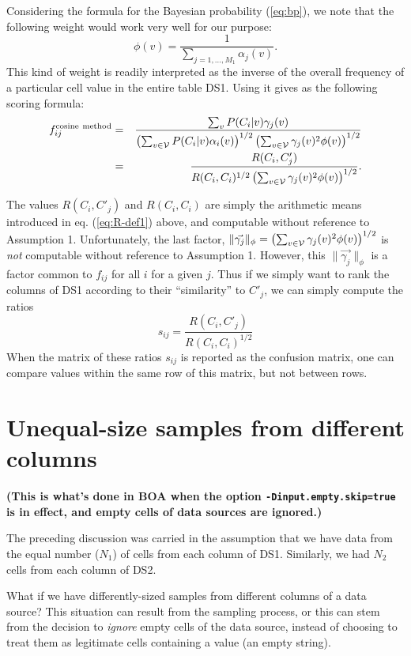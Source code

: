 \documentclass[12pt]{article}
\begin{document}
Considering the formula for the Bayesian probability (\ref{eq:bp}), we
note that the following weight would work very well for our purpose:
$$
\phi(v) = \frac{1}{\sum_{j=1,\ldots,M_1} \alpha_j(v)}.
$$ This kind of weight is readily interpreted as the inverse of the
overall frequency of a particular cell value in the entire table
DS1. Using it gives as the following scoring formula:
\begin{eqnarray}
\label{eq:ag-cos2}
f_{ij}^{\rm cosine \ method} &=& \frac{\sum_v{ P(C_i|v) \gamma_j(v)}}{
\left(\sum_{v\in \cal{V}}{P(C_i|v)\alpha_i(v)}\right)^{1/2}
\left(\sum_{v\in \cal{V}}{\gamma_j(v)^2  \phi(v)}\right)^{1/2}} \\
&=& \frac{ R(C_i,C'_j) }{ R(C_i,C_i)^{1/2} 
\left(\sum_{v\in \cal{V}}{\gamma_j(v)^2  \phi(v)}\right)^{1/2}}.
\end{eqnarray}

The values $R(C_i,C'_j)$ and $R(C_i,C_i)$ are simply the arithmetic
means introduced in eq. (\ref{eq:R-def1}) above, and computable without
reference to Assumption 1. Unfortunately, the last factor,
$\|\vec{\gamma_j}\|_\phi=\left(\sum_{v\in \cal{V}}{\gamma_j(v)^2 \phi(v)}\right)^{1/2}$ is
  {\em not} computable without reference to Assumption 1. However,
  this $\|\vec{\gamma_j}\|_\phi$ is a factor common to $f_{ij}$ for all $i$ for a given
  $j$. Thus if we simply want to rank the columns of DS1 according to
  their ``similarity'' to $C'_j$, we can simply compute the ratios
\begin{equation}
\label{eq:ag-cos3}
s_{ij} = 
 \frac{ R(C_i,C'_j) }{ R(C_i,C_i)^{1/2} }
\end{equation}
When the matrix of these ratios $s_{ij}$ is reported as the confusion
matrix, one can compare values within the same row of this matrix, but
not between rows.

\section{Unequal-size samples from different columns}


{\bf (This is what's done in BOA when the option {\tt -Dinput.empty.skip=true} is in effect, and empty cells of data sources are ignored.)}


The preceding discussion was carried in the assumption that we have
data from the equal number ($N_1$) of cells from each column of
DS1. Similarly, we had $N_2$ cells from each column of DS2.

What if we have differently-sized samples from different columns of a
data source? This situation can result from the sampling process, or
this can stem from the decision to {\em ignore} empty cells of the
data source, instead of choosing to treat them as legitimate cells
containing a value (an empty string).
\end{document}
